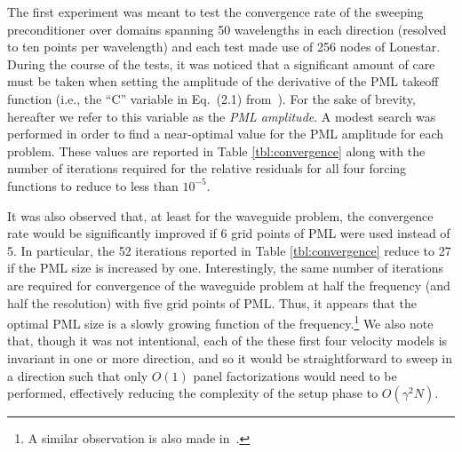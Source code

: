 The first experiment was meant to test the convergence rate of the sweeping 
preconditioner over domains spanning 50 wavelengths in each direction
(resolved to ten points per wavelength) and each test made use of 256 nodes of 
Lonestar. During the course of the tests, it was noticed that a significant 
amount of care must be taken when setting the amplitude of the derivative of 
the PML takeoff function (i.e., the ``C'' variable in Eq.~(2.1) 
from~\cite{EngquistYing-PML}). For the sake of brevity, hereafter we refer to
this variable as the {\em PML amplitude}. A modest search was performed in
order to find a near-optimal value for the PML amplitude for each problem.
These values are reported in Table \ref{tbl:convergence} along with the number 
of iterations required for the relative residuals for all four forcing functions
to reduce to less than $10^{-5}$.






It was also observed that, at least for the waveguide problem, 
the convergence rate would be significantly improved if 6 grid points of PML 
were used instead of 5. 
In particular, the 52 iterations reported in Table \ref{tbl:convergence} reduce 
to 27 if the PML size is increased by one. 
Interestingly, the same number of iterations
are required for convergence of the waveguide problem at half the frequency 
(and half the resolution) with five grid points of PML. Thus, it appears that 
the optimal PML size is a slowly growing function of the 
frequency.\footnote{A similar observation is also made 
in~\cite{Stolk-sweeping}.}
We also note that, though it was not intentional, each of the these first four 
velocity
models is invariant in one or more direction, and so it would be straightforward
to sweep in a direction such that only $O(1)$ panel factorizations would need
to be performed, effectively reducing the complexity of the setup phase to 
$O(\gamma^2 N)$.


